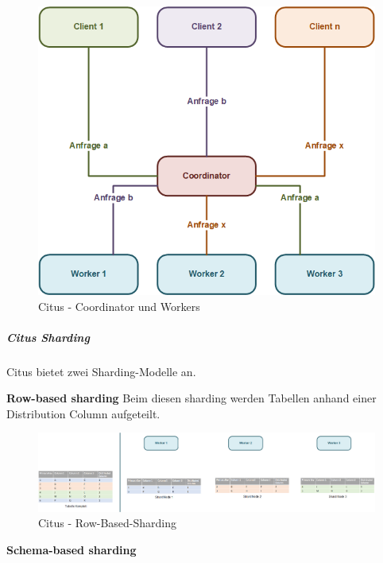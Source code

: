 \begin{flushleft}
\begin{flushleft}
\begin{figure}[H]
            \includegraphics[width=0.75\linewidth]{source/implementation/evaluation/postgresql_ha_solutions/stackgres/citus_coordinator_worker}
            \caption{Citus - Coordinator und Workers}
            \label{fig:citus_coordinator_worker}
        \end{figure}
    \end{flushleft}
    \begin{flushleft}
        \subparagraph{Citus Sharding}
        \label{subpar:citus_sharding}
        Citus bietet zwei Sharding-Modelle an.
        \begin{flushleft}
            \textbf{Row-based sharding}
            Beim diesen sharding werden Tabellen anhand einer Distribution Column aufgeteilt. \cite{2Y5FA36C, FDUUL9IM}
            \begin{figure}[H]
                \centering
                \includegraphics[width=0.8\linewidth]{source/implementation/evaluation/postgresql_ha_solutions/stackgres/citus_row-based-sharding}
                \caption{Citus - Row-Based-Sharding}
                \label{fig:citus_row-based-sharding}
            \end{figure}
        \end{flushleft}
        \begin{flushleft}
            \textbf{Schema-based sharding}
            \begin{figure}[H]
                \centering

\end{figure}
\end{flushleft}
\end{flushleft}
\end{flushleft}
